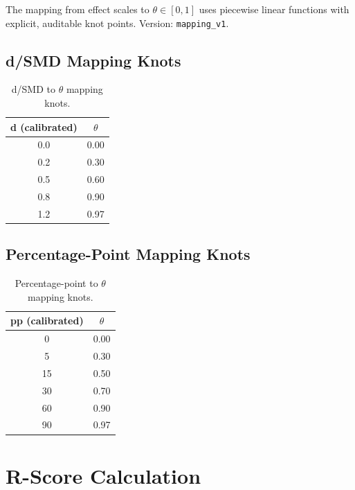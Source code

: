 \begin{tcolorbox}[colback=blue!5!white, colframe=blue!75!black,
    title=Axiom MAP-1: Auditable Mapping]
The mapping from effect scales to $\theta \in [0,1]$ uses piecewise linear functions
with explicit, auditable knot points. Version: \texttt{mapping\_v1}.
\end{tcolorbox}

\subsection{d/SMD Mapping Knots}

\begin{table}[h]
\centering
\begin{tabular}{cc}
\toprule
\textbf{d (calibrated)} & \textbf{$\theta$} \\
\midrule
0.0 & 0.00 \\
0.2 & 0.30 \\
0.5 & 0.60 \\
0.8 & 0.90 \\
1.2 & 0.97 \\
\bottomrule
\end{tabular}
\caption{d/SMD to $\theta$ mapping knots.}
\end{table}

\subsection{Percentage-Point Mapping Knots}

\begin{table}[h]
\centering
\begin{tabular}{cc}
\toprule
\textbf{pp (calibrated)} & \textbf{$\theta$} \\
\midrule
0 & 0.00 \\
5 & 0.30 \\
15 & 0.50 \\
30 & 0.70 \\
60 & 0.90 \\
90 & 0.97 \\
\bottomrule
\end{tabular}
\caption{Percentage-point to $\theta$ mapping knots.}
\end{table}


\section{R-Score Calculation}
\label{sec:iii-rscore}


